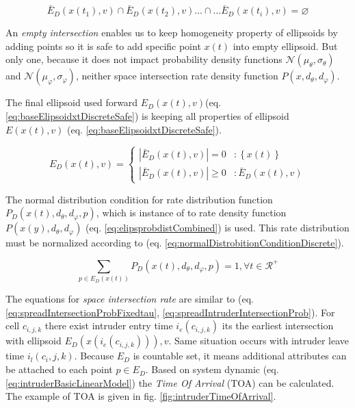 \begin{equation}
    \bar{E}_D({x}(t_1),{v})\cap \bar{E}_D({x}(t_2),{v})\dots\cap\dots \bar{E}_D({x}(t_i),{v}) = \varnothing
\end{equation}

\noindent An \emph{empty intersection} enables us to keep homogeneity property of ellipsoids by adding points so it is safe to add specific point ${x}(t)$ into empty ellipsoid. But only one, because it does not impact  probability density functions $\mathscr{N}(\mu_\theta,\sigma_\theta)$ and $\mathscr{N}(\mu_\varphi,\sigma_\varphi)$, neither space intersection rate  density function $P({x},d_\theta,d_\varphi)$. 

The final ellipsoid used forward $E_D({x}(t),{v})$(eq. \ref{eq:baseElipsoidxtDiscreteSafe}) is keeping all properties of ellipsoid $E({x}(t),{v})$ (eq. \ref{eq:baseElipsoidxtDiscreteSafe}). 

\begin{equation}\label{eq:baseElipsoidxtDiscreteSafe}
    E_D({x}(t),{v})= 
    \begin{cases}
        |\bar{E}_D({x}(t),{v})|=0 &: \left\{{x}(t)\right\} \\
        |\bar{E}_D({x}(t),{v})|\ge0 &: \bar{E}_D({x}(t),{v}) 
    \end{cases}
\end{equation}

\noindent The normal distribution condition for rate distribution function $P_D({x}(t),d_\theta,d_\varphi,{p})$, which is instance of to rate density function $P({x}(y),d_\theta,d_\varphi)$ (eq. \ref{eq:elipsprobdistCombined}) is used. This rate distribution must be normalized according to (eq.  \ref{eq:normalDistrobitionConditionDiscrete}).

\begin{equation}\label{eq:normalDistrobitionConditionDiscrete}
    \sum_{{p} \in E_D({x}(t))} P_D({x}(t),d_\theta,d_\varphi,{p}) = 1,\forall t\in\mathscr{R}^+
\end{equation}

\noindent The equations for \emph{space intersection rate} are similar to (eq. \ref{eq:spreadIntersectionProbFixedtau}, \ref{eq:spreadIntruderIntersectionProb}). For cell $c_{i,j,k}$ there exist intruder entry time $i_e(c_{i,j,k})$ its the earliest intersection with ellipsoid $E_D({x}(i_e(c_{i,j,k}))),{v}$. Same situation occurs with intruder leave time $i_l(c_i,j,k)$. Because $E_D$ is countable set, it means additional attributes can be attached to each point ${p}\in E_D$. Based on system dynamic (eq. \ref{eq:intruderBasicLinearModel}) the \emph{Time Of Arrival} (TOA) can be calculated. The example of TOA is given in fig. \ref{fig:intruderTimeOfArrival}.

